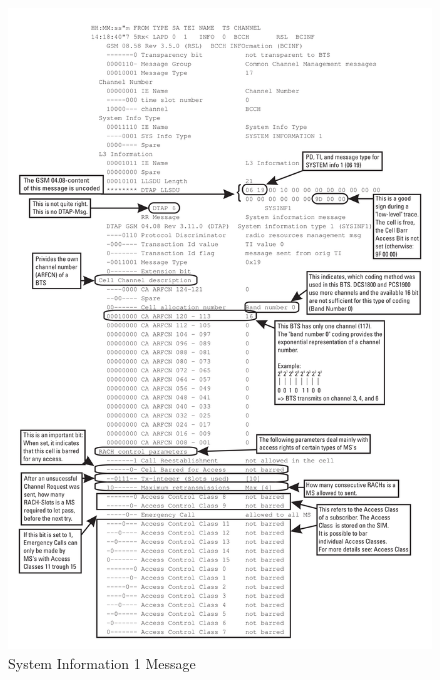 \begin{figure}
\centering
\includegraphics[width=.9\textwidth]{../Images/sysinfo1}
\caption{System Information 1 Message}
\end{figure}
